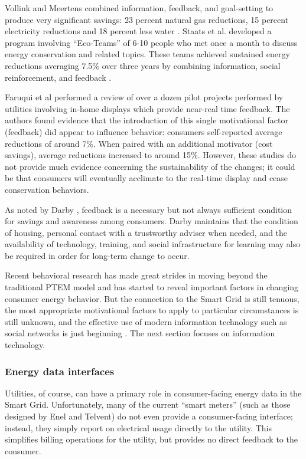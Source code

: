 Vollink and Meertens combined information, feedback, and goal-setting to
produce very significant savings: 23 percent natural gas reductions, 15
percent electricity reductions and 18 percent less water \cite{Vollink99}.
Staats et al. developed a program involving ``Eco-Teams'' of 6-10 people
who met once a month to discuss energy conservation and related
topics. These teams achieved sustained energy reductions averaging 7.5\% over
three years by combining information, social reinforcement, and feedback
\cite{Staats04}.

Faruqui et al \cite{Faruqui09} performed a review of over a dozen pilot projects
performed by utilities involving in-home displays which provide near-real
time feedback.  The authors found evidence that the introduction of this
single motivational factor (feedback) did appear to influence behavior:
consumers self-reported average reductions of around 7\%.   When paired with an
additional motivator (cost savings), average reductions increased to around
15\%.  However, these studies do not provide much evidence concerning the
sustainability of the changes; it could be that consumers will eventually
acclimate to the real-time display and cease conservation behaviors. 

As noted by Darby \cite{Darby06}, feedback is a necessary but
not always sufficient condition for savings and awareness among
consumers. Darby maintains that  the condition of housing, personal contact
with a trustworthy adviser when needed, and the availability of technology, 
training, and social infrastructure for learning may also be required 
in order for long-term change to occur.  

Recent behavioral research has made great strides in moving beyond the
traditional PTEM model and has started to reveal important factors in
changing consumer energy behavior. But the connection to the Smart Grid is
still tenuous, the most appropriate motivational factors to apply to
particular circumstances is still unknown, and the effective use of modern
information technology such as social networks is just beginning
\cite{StepGreen}.  The next section focuses on information technology.

\subsubsection{Energy data interfaces}

Utilities, of course, can have a primary role in consumer-facing energy
data in the Smart Grid. Unfortunately, many of the current ``smart meters''
(such as those designed by Enel and Telvent) do not even provide a
consumer-facing interface; instead, they simply report on electrical usage
directly to the utility.  This simplifies billing operations for the
utility, but provides no direct feedback to the consumer.

